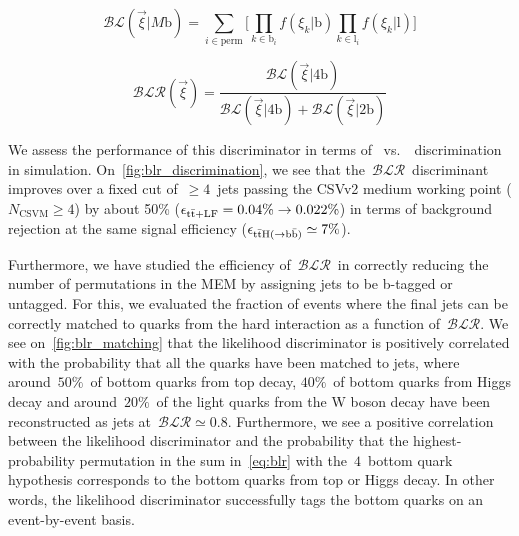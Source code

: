 \begin{equation}
\label{eq:blr}
\mathcal{BL}(\vec{\xi} | M\mathrm{b}) = \sum_{i \in \mathrm{perm}} \biggl[ \prod_{k \in \mathrm{b}_i} f(\xi_k | \mathrm{b}) \prod_{k \in \mathrm{l}_i} f(\xi_k | \mathrm{l}) \biggr]
\end{equation}

\begin{equation}
\label{eq:blr_ratio}
\mathcal{BLR}(\vec{\xi}) = \frac{\mathcal{BL}(\vec{\xi} | 4\mathrm{b})}{\mathcal{BL}(\vec{\xi} | 4\mathrm{b}) + \mathcal{BL}(\vec{\xi} | 2\mathrm{b})}
\end{equation}

We assess the performance of this discriminator in terms of \ttHbb\ vs.~\ttlf~discrimination in simulation. On~\cref{fig:blr_discrimination}, we see that the~$\mathcal{BLR}$~discriminant improves over a fixed cut of~$\ge4$~jets passing the CSVv2 medium working point ($N_{\mathrm{CSVM}} \ge 4$) by about 50\% ($\epsilon_{\mathrm{t} \bar{\mathrm{t}} + \mathrm{LF}} = 0.04\% \rightarrow 0.022\%$) in terms of background rejection at the same signal efficiency ($\epsilon_{\mathrm{t} \bar{\mathrm{t}} \mathrm{H} (\rightarrow \mathrm{b}\bar{\mathrm{b}})} \simeq 7\%$).

Furthermore, we have studied the efficiency of~$\mathcal{BLR}$~in correctly reducing the number of permutations in the MEM by assigning jets to be b-tagged or untagged. For this, we evaluated the fraction of events where the final jets can be correctly matched to quarks from the hard interaction as a function of~$\mathcal{BLR}$. We see on~\cref{fig:blr_matching} that the likelihood discriminator is positively correlated with the probability that all the quarks have been matched to jets, where around~$50\%$~of bottom quarks from top decay, $40\%$~of bottom quarks from Higgs decay and around~$20\%$~of the light quarks from the W boson decay have been reconstructed as jets at~$\mathcal{BLR} \simeq 0.8$. Furthermore, we see a positive correlation between the likelihood discriminator and the probability that the highest-probability permutation in the sum in~\cref{eq:blr} with the~$4$~bottom quark hypothesis corresponds to the bottom quarks from top or Higgs decay. In other words, the likelihood discriminator successfully tags the bottom quarks on an event-by-event basis.

